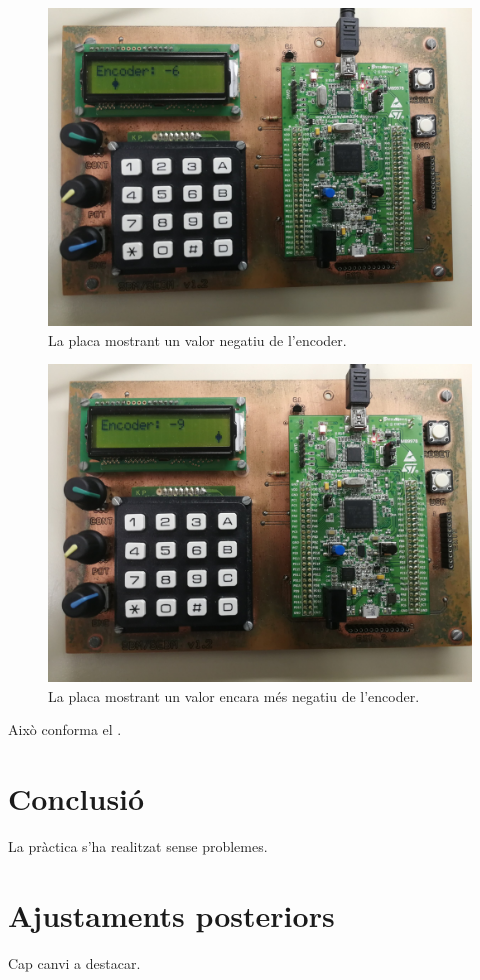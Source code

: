 \begin{figure}[p] %
  \includegraphics[width=.82\columnwidth]{../photos/board/c3-negative}
  \caption{ \label{fig:c3-board-negative} La placa mostrant un valor negatiu de l'encoder. }
\end{figure}
\begin{figure}[p]
  \includegraphics[width=.82\columnwidth]{../photos/board/c3-more-negative}
  \caption{ \label{fig:c3-board-more-negative} La placa mostrant un valor encara més negatiu de l'encoder. }
\end{figure}

Això conforma el .


\section{Conclusió}

La pràctica s'ha realitzat sense problemes.

\section{Ajustaments posteriors}

Cap canvi a destacar.

